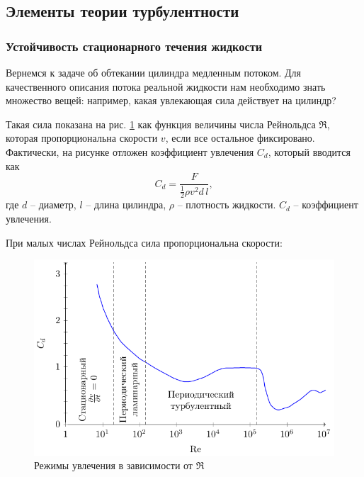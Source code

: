 \newpage
{}
\subsection{Элементы теории турбулентности}
\subsubsection{Устойчивость стационарного течения жидкости}
Вернемся к задаче об обтекании цилиндра медленным потоком. Для качественного описания потока реальной жидкости нам необходимо знать множество вещей: например, какая увлекающая сила действует на цилиндр? 

Такая сила показана на рис. \ref{fig:cdre} как функция величины числа Рейнольдса $\Re$, которая пропорциональна скорости $v$, если все остальное фиксировано. Фактически, на рисунке отложен коэффициент увлечения $C_d$, который вводится как 
\begin{equation}
    C_d  = \frac{F}{\frac{1}{2} \rho v^2 d\,l},
\end{equation}
где $d$ -- диаметр, $l$ -- длина цилиндра, 
$\rho$ -- плотность жидкости. $C_d$ -- коэффициент увлечения.

При малых числах Рейнольдса сила пропорциональна скорости:
\begin{figure}[H]
    \centering
    \includegraphics[scale=1.4]{img/recd}
    \caption{Режимы увлечения в зависимости от  $\Re$}
    \label{fig:cdre}
\end{figure}




